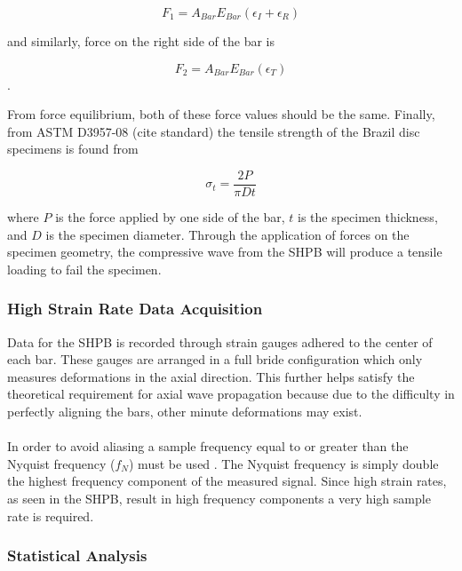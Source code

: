 \documentclass[12pt]{article}
\begin{document}
\begin{equation}
F_1 = A_{Bar}E_{Bar}(\epsilon_I + \epsilon_R)
\end{equation}

and similarly, force on the right side of the bar is

\begin{equation}
F_2 = A_{Bar}E_{Bar}(\epsilon_T)
\end{equation}.

From force equilibrium, both of these force values should be the same. Finally, from ASTM D3957-08 (cite standard) the tensile strength of the Brazil disc specimens is found from

\begin{equation}
\sigma_t = \frac{2P}{\pi Dt}
\label{eq:stress}
\end{equation}

where $P$ is the force applied by one side of the bar, $t$ is the specimen thickness, and $D$ is the specimen diameter. Through the application of forces on the specimen geometry, the compressive wave from the SHPB will produce a tensile loading to fail the specimen.

\subsubsection{High Strain Rate Data Acquisition} %
Data for the SHPB is recorded through strain gauges adhered to the center of each bar. These gauges are arranged in a full bride configuration which only measures deformations in the axial direction. This further helps satisfy the theoretical requirement for axial wave propagation because due to the difficulty in perfectly aligning the bars, other minute deformations may exist.
\\ \\
In order to avoid aliasing a sample frequency equal to or greater than the Nyquist frequency ($f_N$) must be used \cite{Shukla} \cite{Sampling}. The Nyquist frequency is simply double the highest frequency component of the measured signal. Since high strain rates, as seen in the SHPB, result in high frequency components a very high sample rate is required. 

\subsubsection{Statistical Analysis} %
\end{document}
